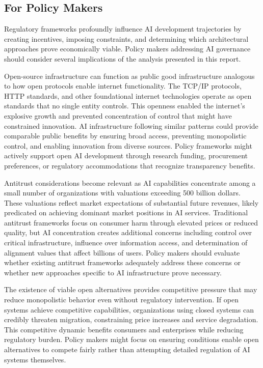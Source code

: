 \subsection{For Policy Makers}

Regulatory frameworks profoundly influence AI development trajectories by creating incentives, imposing constraints, and determining which architectural approaches prove economically viable. Policy makers addressing AI governance should consider several implications of the analysis presented in this report.

Open-source infrastructure can function as public good infrastructure analogous to how open protocols enable internet functionality. The TCP/IP protocols, HTTP standards, and other foundational internet technologies operate as open standards that no single entity controls. This openness enabled the internet's explosive growth and prevented concentration of control that might have constrained innovation. AI infrastructure following similar patterns could provide comparable public benefits by ensuring broad access, preventing monopolistic control, and enabling innovation from diverse sources. Policy frameworks might actively support open AI development through research funding, procurement preferences, or regulatory accommodations that recognize transparency benefits.

Antitrust considerations become relevant as AI capabilities concentrate among a small number of organizations with valuations exceeding 500 billion dollars. These valuations reflect market expectations of substantial future revenues, likely predicated on achieving dominant market positions in AI services. Traditional antitrust frameworks focus on consumer harm through elevated prices or reduced quality, but AI concentration creates additional concerns including control over critical infrastructure, influence over information access, and determination of alignment values that affect billions of users. Policy makers should evaluate whether existing antitrust frameworks adequately address these concerns or whether new approaches specific to AI infrastructure prove necessary.

The existence of viable open alternatives provides competitive pressure that may reduce monopolistic behavior even without regulatory intervention. If open systems achieve competitive capabilities, organizations using closed systems can credibly threaten migration, constraining price increases and service degradation. This competitive dynamic benefits consumers and enterprises while reducing regulatory burden. Policy makers might focus on ensuring conditions enable open alternatives to compete fairly rather than attempting detailed regulation of AI systems themselves.

